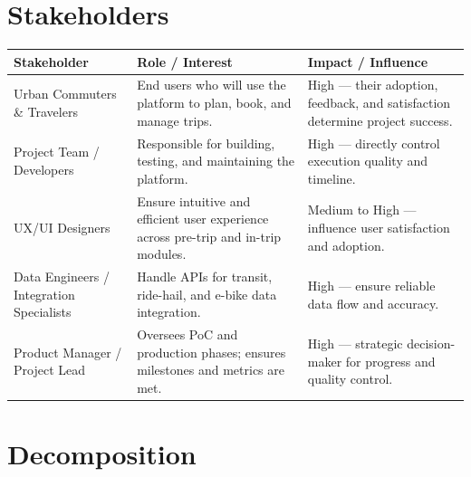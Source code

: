 \section{Stakeholders}
\renewcommand{\arraystretch}{1.15}
\begin{tabularx}{\textwidth}{|>{\raggedright\arraybackslash}p{3.8cm}|>{\raggedright\arraybackslash}p{6.2cm}|>{\raggedright\arraybackslash}X|}
\hline
	\textbf{Stakeholder} & \textbf{Role / Interest} & \textbf{Impact / Influence} \\
\hline
Urban Commuters \& Travelers & End users who will use the platform to plan, book, and manage trips. & High --- their adoption, feedback, and satisfaction determine project success. \\
\hline
Project Team / Developers & Responsible for building, testing, and maintaining the platform. & High --- directly control execution quality and timeline. \\
\hline
UX/UI Designers & Ensure intuitive and efficient user experience across pre-trip and in-trip modules. & Medium to High --- influence user satisfaction and adoption. \\
\hline
Data Engineers / Integration Specialists & Handle APIs for transit, ride-hail, and e-bike data integration. & High --- ensure reliable data flow and accuracy. \\
\hline
Product Manager / Project Lead & Oversees PoC and production phases; ensures milestones and metrics are met. & High --- strategic decision-maker for progress and quality control. \\
\hline
\end{tabularx}


\section{Decomposition}


